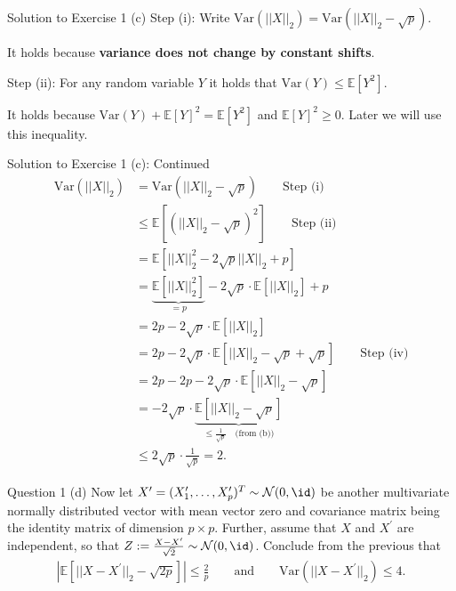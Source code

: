 \documentclass[aspectratio=169]{beamer}
\renewcommand{\E}{\mathbb{E}}
\newcommand{\Xnorm}{||X||_2}
\newcommand{\Xnormsq}{||X||_2^2}
\newcommand{\Var}[1]{\mathrm{Var}(#1)}
\newcommand{\Xp}{X^\prime}
\begin{document}
\begin{frame}{Solution to Exercise 1 (c)}
	Step (i): Write $\Var{\Xnorm} = \Var{\Xnorm - \sqrt{p}}$.
	\vspace{20pt}
	
	It holds because \textbf{variance does not change by constant shifts}. 
	\vspace{20pt}
	
	Step (ii): For any random variable $Y$ it holds that $\Var{Y} \leq \E[Y^2] $.
	\vspace{20pt}
	
	It holds because $\Var{Y} + \E[Y]^2 = \E[Y^2]$ and $\E[Y]^2 \geq 0$. Later we will use this inequality.
\end{frame}

\begin{frame}{Solution to Exercise 1 (c): Continued}
	\small
	\begin{align*}
		\Var{\Xnorm} 
		&= \Var{\Xnorm - \sqrt{p}} \qquad \text{Step (i)} \\
		&\leq \E[(\Xnorm - \sqrt{p})^2] \qquad \text{Step (ii)} \\
		&= \E[ \Xnormsq - 2 \sqrt{p} \Xnorm  + p ] \\
		&= \underbrace{\E[\Xnormsq]}_{=p} - 2 \sqrt{p} \cdot \E[\Xnorm] + p \\
		&= 2p  - 2\sqrt{p} \cdot \E[\Xnorm] \\
		&= 2p - 2\sqrt{p}\cdot \E[\Xnorm - \sqrt{p} + \sqrt{p}] \qquad \text{Step (iv)} \\
		&= 2p - 2p - 2\sqrt{p} \cdot \E[\Xnorm - \sqrt{p}] \\
		&= -2\sqrt{p} \cdot \underbrace{\E[\Xnorm - \sqrt{p}]}_{\leq \frac{1}{\sqrt{p}} \quad \text{(from (b))}} \\
		&\leq 2\sqrt{p} \cdot \frac{1}{\sqrt{p}} = 2.
	\end{align*}
\end{frame}

\begin{frame}{Question 1 (d)}
	Now let $\Xp = (X_1^\prime, \ldots, X_p^\prime)^T \sim \mathcal{N}(0, \id)$ be another multivariate normally distributed vector with mean vector zero and covariance matrix being the identity matrix of dimension $p \times p$. Further, assume that $X$ and $X^\prime$ are independent, so that $Z:= \frac{X - \Xp}{\sqrt{2}} \sim \mathcal{N}(0, \id)$. Conclude from the previous that 
	\begin{align*}
		\left| \E \left[|| X - \Xp||_2 - \sqrt{2p} \right] \right| \leq \frac{2}{p} \qquad \text{and} \qquad \Var{||X - \Xp ||_2} \leq 4.
	\end{align*}
\end{frame}
\end{document}
